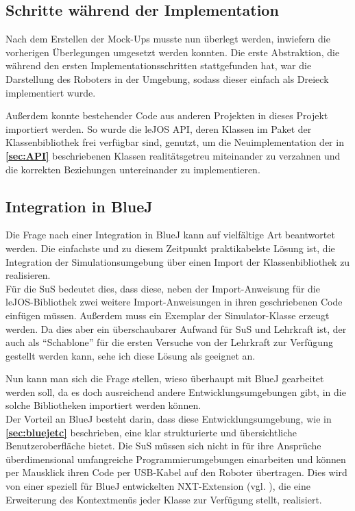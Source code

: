 \documentclass[paper=a4, DIV=14, BCOR=15mm, twoside=on, onecolumn=on, open = right, titlepage =on, parskip =half, headsepline = on, footsepline = on, chapterprefix = on, appendixprefix = off, fontsize = 12pt, numbers = noenddot, abstract = on]{scrbook}
\begin{document}
\subsection{Schritte während der Implementation}
\onehalfspacing
Nach dem Erstellen der Mock-Ups musste nun überlegt werden, inwiefern die vorherigen Überlegungen umgesetzt werden konnten. Die erste Abstraktion, die während den ersten Implementationsschritten stattgefunden hat, war die Darstellung des Roboters in der Umgebung, sodass dieser einfach als Dreieck implementiert wurde. 

Außerdem konnte bestehender Code aus anderen Projekten in dieses Projekt importiert werden. So wurde die leJOS API, deren Klassen im Paket der Klassenbibliothek frei verfügbar sind, genutzt, um die Neuimplementation der in \textbf{\ref{sec:API}} beschriebenen Klassen realitätsgetreu miteinander zu verzahnen und die korrekten Beziehungen untereinander zu implementieren.

\par \singlespacing
\subsection{Integration in BlueJ}
\label{sec:integration}
\onehalfspacing
Die Frage nach einer Integration in BlueJ kann auf vielfältige Art beantwortet werden. Die einfachste und zu diesem Zeitpunkt praktikabelste Lösung ist, die Integration der Simulationsumgebung über einen Import der Klassenbibliothek zu realisieren.\\
Für die SuS bedeutet dies, dass diese, neben der Import-Anweisung für die leJOS-Bibliothek zwei weitere Import-Anweisungen in ihren geschriebenen Code einfügen müssen. Außerdem muss ein Exemplar der Simulator-Klasse erzeugt werden. Da dies aber ein überschaubarer Aufwand für SuS und Lehrkraft ist, der auch als "`Schablone"' für die ersten Versuche von der Lehrkraft zur Verfügung gestellt werden kann, sehe ich diese Lösung als geeignet an.

Nun kann man sich die Frage stellen, wieso überhaupt mit BlueJ gearbeitet werden soll, da es doch ausreichend andere Entwicklungsumgebungen gibt, in die solche Bibliotheken importiert werden können.\\
Der Vorteil an BlueJ besteht darin, dass diese Entwicklungsumgebung, wie in \textbf{\ref{sec:bluejetc}} beschrieben, eine klar strukturierte und übersichtliche Benutzeroberfläche bietet. Die SuS müssen sich nicht in für ihre Ansprüche überdimensional umfangreiche Programmierumgebungen einarbeiten und können per Mausklick ihren Code per USB-Kabel auf den Roboter übertragen. Dies wird von einer speziell für BlueJ entwickelten NXT-Extension  (vgl. \cite{bowes:12}), die eine Erweiterung des Kontextmenüs jeder Klasse zur Verfügung stellt, realisiert.
\end{document}
